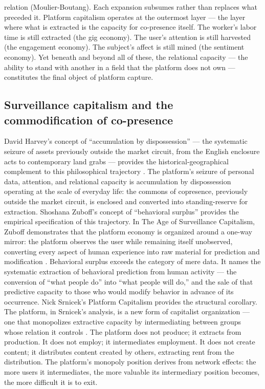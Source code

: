relation (Moulier-Boutang). Each expansion subsumes rather than replaces what preceded it. Platform capitalism operates at the outermost layer — the layer where what is extracted is the capacity for co-presence itself. The worker’s labor time is still extracted (the gig economy). The user’s attention is still harvested (the engagement economy). The subject’s affect is still mined (the sentiment economy). Yet beneath and beyond all of these, the relational capacity — the ability to stand with another in a field that the platform does not own — constitutes the final object of platform capture.

\subsection{Surveillance capitalism and the commodification of co-presence}

David Harvey’s concept of “accumulation by dispossession” — the systematic seizure of assets previously outside the market circuit, from the English enclosure acts to contemporary land grabs — provides the historical-geographical complement to this philosophical trajectory \cite{harvey_2003}. The platform’s seizure of personal data, attention, and relational capacity is accumulation by dispossession operating at the scale of everyday life: the commons of copresence, previously outside the market circuit, is enclosed and converted into standing-reserve for extraction. Shoshana Zuboff’s concept of “behavioral surplus” provides the empirical specification of this trajectory. In The Age of Surveillance Capitalism, Zuboff demonstrates that the platform economy is organized around a one-way mirror: the platform observes the user while remaining itself unobserved, converting every aspect of human experience into raw material for prediction and modification \cite[pp.~8--67]{zuboff_2019}. Behavioral surplus exceeds the category of mere data. It names the systematic extraction of behavioral prediction from human activity — the conversion of “what people do” into “what people will do,” and the sale of that predictive capacity to those who would modify behavior in advance of its occurrence. Nick Srnicek’s Platform Capitalism provides the structural corollary. The platform, in Srnicek’s analysis, is a new form of capitalist organization — one that monopolizes extractive capacity by intermediating between groups whose relation it controls \cite{srnicek_2017}. The platform does not produce; it extracts from production. It does not employ; it intermediates employment. It does not create content; it distributes content created by others, extracting rent from the distribution. The platform’s monopoly position derives from network effects: the more users it intermediates, the more valuable its intermediary position becomes, the more difficult it is to exit.

